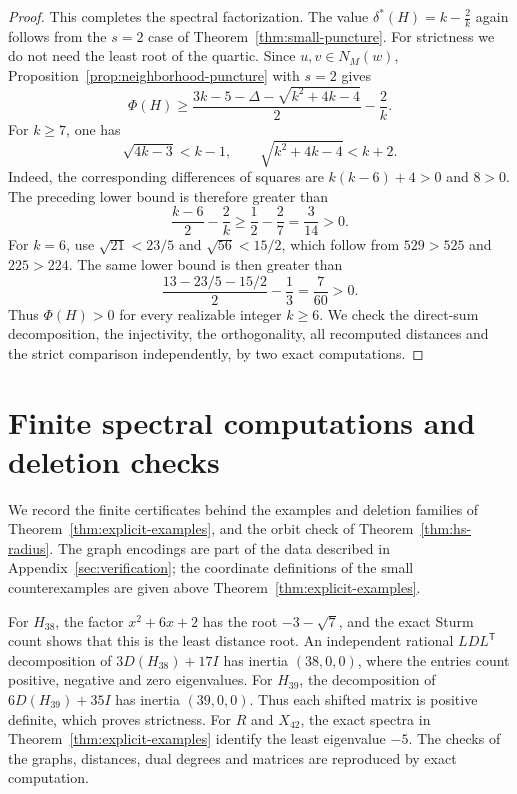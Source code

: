 \documentclass[a4paper,10pt,reqno]{amsart}
\theoremstyle{plain}
\theoremstyle{definition}
\theoremstyle{remark}
\begin{document}
\begin{proof}
This completes the spectral factorization.  The value
\(\delta^*(H)=k-\frac2k\) again follows from the \(s=2\) case of
Theorem~\ref{thm:small-puncture}. For strictness we do not need the least
root of the quartic. Since \(u,v\in N_M(w)\),
Proposition~\ref{prop:neighborhood-puncture} with \(s=2\) gives
\[
 \Phi(H)\ge
 \frac{3k-5-\Delta-\sqrt{k^2+4k-4}}2-\frac2k.
\]
For \(k\ge7\), one has
\[
 \sqrt{4k-3}<k-1,
 \qquad
 \sqrt{k^2+4k-4}<k+2.
\]
Indeed, the corresponding differences of squares are
\(k(k-6)+4>0\) and \(8>0\).  The preceding lower bound is therefore
greater than
\[
 \frac{k-6}{2}-\frac2k
 \ge\frac12-\frac27=\frac3{14}>0.
\]
For \(k=6\), use \(\sqrt{21}<23/5\) and \(\sqrt{56}<15/2\), which
follow from \(529>525\) and \(225>224\).  The same lower bound is then
greater than
\[
 \frac{13-23/5-15/2}{2}-\frac13=\frac7{60}>0.
\]
Thus \(\Phi(H)>0\) for every realizable integer \(k\ge6\).
We check the direct-sum decomposition, the injectivity, the orthogonality,
all recomputed distances and the strict comparison independently, by two
exact computations.
\end{proof}


\section{Finite spectral computations and deletion checks}
\label{app:small-example-certificates}

We record the finite certificates behind the examples and deletion families of
Theorem~\ref{thm:explicit-examples}, and the orbit check of
Theorem~\ref{thm:hs-radius}.
The graph encodings are part of the data described in
Appendix~\ref{sec:verification}; the coordinate definitions of the small counterexamples
are given above Theorem~\ref{thm:explicit-examples}.

For \(H_{38}\), the factor \(x^2+6x+2\) has the root \(-3-\sqrt7\), and the
exact Sturm count shows that this is the least distance root.
An independent rational \(LDL^{\mathsf T}\) decomposition of
\(3D(H_{38})+17I\) has inertia \((38,0,0)\), where the entries count
positive, negative and zero eigenvalues.
For \(H_{39}\), the decomposition of \(6D(H_{39})+35I\) has inertia
\((39,0,0)\). Thus each shifted matrix is positive definite, which proves
strictness.
For \(R\) and \(X_{42}\), the exact spectra in
Theorem~\ref{thm:explicit-examples} identify the least eigenvalue \(-5\).
The checks of the graphs, distances, dual degrees and matrices are
reproduced by exact computation.
\end{document}
